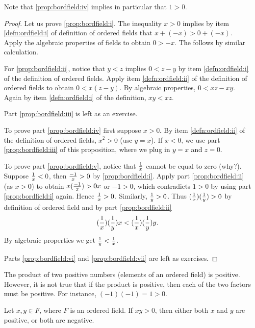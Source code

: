 Note that \ref{prop:bordfield:iv} implies in particular that $1 > 0$.

\begin{proof}
Let us prove \ref{prop:bordfield:i}.  The inequality $x > 0$ implies by item
\ref{defn:ordfield:i} of definition of ordered fields that
$x + (-x) > 0 + (-x)$.  Apply the algebraic properties of fields to
obtain $0 > -x$.  The  follows by similar calculation.

For \ref{prop:bordfield:ii}, notice that $y < z$ implies
$0 < z - y$ by
item \ref{defn:ordfield:i} of the definition of ordered fields.  
Apply item 
\ref{defn:ordfield:ii} of the definition of ordered fields to obtain
$0 < x(z-y)$.  By algebraic properties, $0 < xz - xy$.
Again by item
\ref{defn:ordfield:i} of the definition, $xy < xz$.

Part \ref{prop:bordfield:iii} is left as an exercise.

To prove part \ref{prop:bordfield:iv} first suppose $x > 0$.
By item 
\ref{defn:ordfield:ii} of the definition of ordered fields,
$x^2 > 0$ (use $y=x$).  If $x < 0$, we use 
part \ref{prop:bordfield:iii} of this proposition, where we plug in $y=x$ and
$z=0$.

To prove part \ref{prop:bordfield:v}, notice that
$\nicefrac{1}{x}$ cannot be equal to zero (why?).
Suppose $\nicefrac{1}{x} < 0$,
then $\nicefrac{-1}{x} > 0$ by \ref{prop:bordfield:i}.  Apply
part \ref{prop:bordfield:ii} (as $x > 0$) to obtain
$x(\nicefrac{-1}{x}) > 0x$ or $-1 > 0$, which contradicts $1 > 0$ by using part
\ref{prop:bordfield:i} again.  Hence $\nicefrac{1}{x} > 0$.
Similarly, $\nicefrac{1}{y} > 0$.  Thus $(\nicefrac{1}{x})(\nicefrac{1}{y}) > 0$
by definition of ordered field and by part \ref{prop:bordfield:ii}
\begin{equation*}
(\nicefrac{1}{x})(\nicefrac{1}{y})x < (\nicefrac{1}{x})(\nicefrac{1}{y})y .
\end{equation*}
By algebraic properties we get $\nicefrac{1}{y} < \nicefrac{1}{x}$.

Parts \ref{prop:bordfield:vi} and \ref{prop:bordfield:vii} are left as
exercises.
\end{proof}

The product of two positive numbers (elements of an ordered field) is positive.
However, it is not true that if the product is positive, then each of the two
factors must be positive.  For instance, $(-1)(-1) = 1 > 0$.

\begin{prop}
Let $x,y \in F$, where $F$ is an ordered field.  If
$xy > 0$, then either both $x$ and $y$ are positive, or both are negative.
\end{prop}


